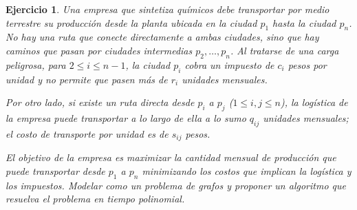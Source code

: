 \documentclass[a4paper,oneside,12pt]{amsart}
\newtheorem{quest}{Ejercicio}
\begin{document}


\begin{quest}

Una empresa que sintetiza químicos debe transportar por medio terrestre su producción desde la planta ubicada en la ciudad $p_1$ hasta la ciudad $p_n$. No hay una ruta que conecte directamente a ambas ciudades, sino que hay caminos que pasan por ciudades intermedias $p_2, \dots, p_n$. 
Al tratarse de una carga peligrosa, para $2\leq i\leq n-1$, la ciudad $p_i$ cobra un impuesto de $c_i$ pesos por unidad y no permite que pasen más de $r_i$ unidades mensuales.

Por otro lado, si existe un ruta directa desde $p_i$ a $p_j$ ($1\leq i,j\leq n$), la logística de la empresa puede transportar a lo largo de ella a lo sumo $q_{ij}$ unidades mensuales; el costo de transporte por unidad es de $s_{ij}$ pesos.

El objetivo de la empresa es maximizar la cantidad mensual de producción que puede transportar desde $p_1$ a $p_n$ minimizando los costos que implican la logística y los impuestos. Modelar como un problema de grafos y proponer un algoritmo que resuelva el problema en tiempo polinomial.




    

\end{quest}


\end{document}
